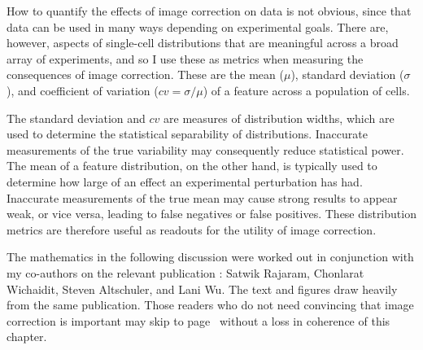 How to quantify the effects of image correction on data is not obvious,
since that data can be used in many ways depending on experimental goals.
There are, however, aspects of
single-cell distributions that are meaningful across a broad array of
experiments, and so I use these as metrics when measuring the consequences
of image correction. These are the mean ($\mu$), standard deviation ($\sigma$),
and coefficient of variation ($cv=\sigma/\mu$) of a feature across a population of cells.


The standard deviation and $cv$ are measures of distribution widths, which
are used to determine the statistical separability of distributions.
Inaccurate measurements of the true variability may
consequently reduce statistical power.
The mean of a feature distribution, on the other hand,
is typically used to determine how large of an
effect an experimental perturbation has had. Inaccurate measurements of the true mean
may cause strong results to appear weak, or vice versa, leading to false
negatives or false positives. These distribution metrics are
therefore useful as readouts for the utility of image correction.


The mathematics in the following discussion were
worked out in conjunction with my co-authors on the relevant
publication \cite{Coster2014}: Satwik Rajaram, Chonlarat Wichaidit,
Steven Altschuler, and Lani Wu. The text
and figures draw heavily from the same publication. Those readers
who do not need convincing that image correction is important may skip
to page~\pageref{imaging:correction:review} without a loss in coherence
of this chapter.


